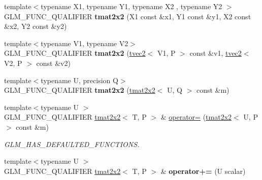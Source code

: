 \begin{DoxyCompactItemize}
\mbox{\label{structglm_1_1tmat2x2_a49088761b4a3aaef14400d8e5fc51bc8}} 
{\footnotesize template$<$typename X1, typename Y1, typename X2 , typename Y2 $>$ }\\G\+L\+M\+\_\+\+F\+U\+N\+C\+\_\+\+Q\+U\+A\+L\+I\+F\+I\+ER {\bfseries tmat2x2} (X1 const \&x1, Y1 const \&y1, X2 const \&x2, Y2 const \&y2)
\item 
\mbox{\label{structglm_1_1tmat2x2_a62395ad6e9a11a42689e7cc9ee3b6302}} 
{\footnotesize template$<$typename V1, typename V2$>$ }\\G\+L\+M\+\_\+\+F\+U\+N\+C\+\_\+\+Q\+U\+A\+L\+I\+F\+I\+ER {\bfseries tmat2x2} (\hyperlink{structglm_1_1tvec2}{tvec2}$<$ V1, P $>$ const \&v1, \hyperlink{structglm_1_1tvec2}{tvec2}$<$ V2, P $>$ const \&v2)
\item 
\mbox{\label{structglm_1_1tmat2x2_a2441e71c7648e358d5e65f2d21ed123a}} 
{\footnotesize template$<$typename U, precision Q$>$ }\\G\+L\+M\+\_\+\+F\+U\+N\+C\+\_\+\+Q\+U\+A\+L\+I\+F\+I\+ER {\bfseries tmat2x2} (\hyperlink{structglm_1_1tmat2x2}{tmat2x2}$<$ U, Q $>$ const \&m)
\item 
\mbox{\label{structglm_1_1tmat2x2_a44d29639987fd39514ae079271487363}} 
{\footnotesize template$<$typename U $>$ }\\G\+L\+M\+\_\+\+F\+U\+N\+C\+\_\+\+Q\+U\+A\+L\+I\+F\+I\+ER \hyperlink{structglm_1_1tmat2x2}{tmat2x2}$<$ T, P $>$ \& \hyperlink{structglm_1_1tmat2x2_a44d29639987fd39514ae079271487363}{operator=} (\hyperlink{structglm_1_1tmat2x2}{tmat2x2}$<$ U, P $>$ const \&m)
\begin{DoxyCompactList}\small\item\em G\+L\+M\+\_\+\+H\+A\+S\+\_\+\+D\+E\+F\+A\+U\+L\+T\+E\+D\+\_\+\+F\+U\+N\+C\+T\+I\+O\+NS. \end{DoxyCompactList}\item 
\mbox{\label{structglm_1_1tmat2x2_ac99f3a24a6cf9a42c8df894ee7ab4845}} 
{\footnotesize template$<$typename U $>$ }\\G\+L\+M\+\_\+\+F\+U\+N\+C\+\_\+\+Q\+U\+A\+L\+I\+F\+I\+ER \hyperlink{structglm_1_1tmat2x2}{tmat2x2}$<$ T, P $>$ \& {\bfseries operator+=} (U scalar)
\item 
\mbox{\label{structglm_1_1tmat2x2_a2edb661b12cd29f51e3dee238d904408}} 

\end{DoxyCompactItemize}
